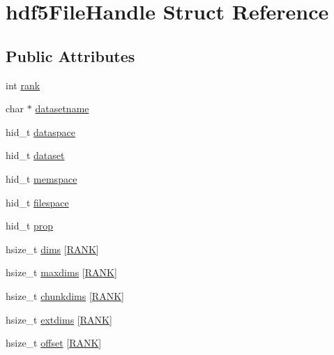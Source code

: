 \hypertarget{structhdf5_file_handle}{\section{hdf5\+File\+Handle Struct Reference}
\label{structhdf5_file_handle}
}
\subsection*{Public Attributes}
\begin{DoxyCompactItemize}
\item 
int \hyperlink{structhdf5_file_handle_aebdea3da56b253e892a18e5725507a4f}{rank}
\item 
char $\ast$ \hyperlink{structhdf5_file_handle_a597ef1d78a719e76d9f02ffb115d78d5}{datasetname}
\item 
hid\+\_\+t \hyperlink{structhdf5_file_handle_a9d7c01c66044c4e4a39019e918adcdd0}{dataspace}
\item 
hid\+\_\+t \hyperlink{structhdf5_file_handle_af77d7a91e4d8955453a7448c8946d8bc}{dataset}
\item 
hid\+\_\+t \hyperlink{structhdf5_file_handle_a56647b709a255b3cf28de36c34c95e6e}{memspace}
\item 
hid\+\_\+t \hyperlink{structhdf5_file_handle_a49dc56f4893927a65f6dcdd2bd544aee}{filespace}
\item 
hid\+\_\+t \hyperlink{structhdf5_file_handle_a412d7866b73b0dc4f6aca7207fb33b46}{prop}
\item 
hsize\+\_\+t \hyperlink{structhdf5_file_handle_a09b1510d745e77343bd14981f379b3d2}{dims} \mbox{[}\hyperlink{hdf5_helpers_8cuh_a4e76a9ce86d91fa75775a7ae3f8d3aa5}{R\+A\+N\+K}\mbox{]}
\item 
hsize\+\_\+t \hyperlink{structhdf5_file_handle_a156a909792c70cd54e8a6171ede9510c}{maxdims} \mbox{[}\hyperlink{hdf5_helpers_8cuh_a4e76a9ce86d91fa75775a7ae3f8d3aa5}{R\+A\+N\+K}\mbox{]}
\item 
hsize\+\_\+t \hyperlink{structhdf5_file_handle_add4d9b7270f97f19abc571474abdd3e9}{chunkdims} \mbox{[}\hyperlink{hdf5_helpers_8cuh_a4e76a9ce86d91fa75775a7ae3f8d3aa5}{R\+A\+N\+K}\mbox{]}
\item 
hsize\+\_\+t \hyperlink{structhdf5_file_handle_a3df5c5a29ea2679e33d7ca3517b65e04}{extdims} \mbox{[}\hyperlink{hdf5_helpers_8cuh_a4e76a9ce86d91fa75775a7ae3f8d3aa5}{R\+A\+N\+K}\mbox{]}
\item 
hsize\+\_\+t \hyperlink{structhdf5_file_handle_acf27de195b0db221bc7923e23773577e}{offset} \mbox{[}\hyperlink{hdf5_helpers_8cuh_a4e76a9ce86d91fa75775a7ae3f8d3aa5}{R\+A\+N\+K}\mbox{]}
\end{DoxyCompactItemize}


